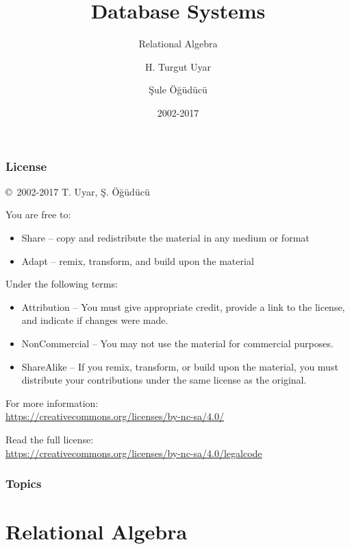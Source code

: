 \documentclass[dvipsnames]{beamer}
\title{Database Systems}
\subtitle{Relational Algebra}
\author{H. Turgut Uyar \and Şule Öğüdücü}
\date{2002-2017}
\theoremstyle{plain}
\begin{document}
\begin{frame}
  \titlepage
\end{frame}

\begin{frame}
  \frametitle{License}

  \hfill
  \copyright~2002-2017 T. Uyar, Ş. Öğüdücü

  \vfill
  \begin{footnotesize}
    You are free to:
    \begin{itemize}
      \itemsep0em
      \item Share -- copy and redistribute the material in any medium or format
      \item Adapt -- remix, transform, and build upon the material
    \end{itemize}

    Under the following terms:
    \begin{itemize}
      \itemsep0em
      \item Attribution -- You must give appropriate credit, provide a link to
        the license, and indicate if changes were made.

      \item NonCommercial -- You may not use the material for commercial
        purposes.

      \item ShareAlike -- If you remix, transform, or build upon the material,
        you must distribute your contributions under the same license as the
        original.
    \end{itemize}
  \end{footnotesize}

  \begin{small}
    For more information:\\
    \url{https://creativecommons.org/licenses/by-nc-sa/4.0/}

    \smallskip
    Read the full license:\\
    \url{https://creativecommons.org/licenses/by-nc-sa/4.0/legalcode}
  \end{small}
\end{frame}

\begin{frame}
  \frametitle{Topics}
  \tableofcontents
\end{frame}

\lstset{language=TutorialD}

\section{Relational Algebra}
\end{document}
